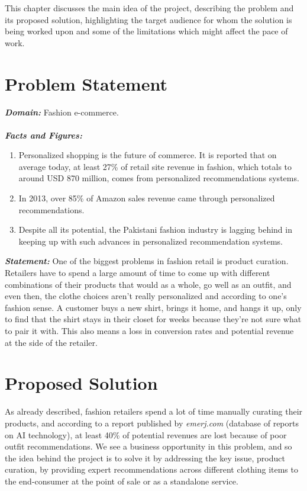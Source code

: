This chapter discusses the main idea of the project, describing the problem and its proposed solution, highlighting the target audience for whom the solution is being worked upon and some of the limitations which might affect the pace of work. 
\section{Problem Statement}
\textbf{\emph{Domain:}} Fashion e-commerce. \\\\
\textbf{\emph{Facts and Figures:}} 
\begin{enumerate}
	\item Personalized shopping is the future of commerce. It is reported that on average today, at least 27\% of retail site revenue in fashion, which totals to around USD 870 million, comes from personalized recommendations systems. \cite{salesforce}
	\item In 2013, over 85\% of Amazon sales revenue came through personalized recommendations. \cite{mckinsey}
	\item Despite all its potential, the Pakistani fashion industry is lagging behind in keeping up with such advances in personalized recommendation systems. \cite{thenewspk}
\end{enumerate}
\textbf{\emph{Statement:}} One of the biggest problems in fashion retail is product curation. Retailers have to spend a large amount of time to come up with different combinations of their products that would as a whole, go well as an outfit, and even then, the clothe choices aren’t really personalized and according to one's fashion sense. A customer buys a new shirt, brings it home, and hangs it up, only to find that the shirt stays in their closet for weeks because they’re not sure what to pair it with. This also means a loss in conversion rates and potential revenue at the side of the retailer.

\section{Proposed Solution}

As already described, fashion retailers spend a lot of time manually curating their products, and according to a report published by \textit{emerj.com} (database of reports on AI technology), at least 40\% of potential revenues are lost because of poor outfit recommendations. We see a business opportunity in this problem, and so the idea behind the project is to solve it by addressing the key issue, product curation, by providing expert recommendations across different clothing items to the end-consumer at the point of sale or as a standalone service.


